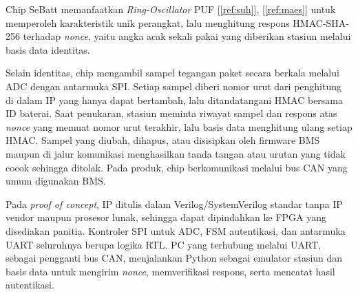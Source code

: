\documentclass[11pt,a4paper]{article}
\newcommand{\rujuk}[1]{[\ref{#1}]}   %
\begin{document}
Chip SeBatt memanfaatkan \textit{Ring-Oscillator} PUF \rujuk{ref:suh}, \rujuk{ref:maes} untuk memperoleh karakteristik unik perangkat, lalu menghitung respons HMAC-SHA-256 terhadap \textit{nonce}, yaitu angka acak sekali pakai yang diberikan stasiun melalui basis data identitas.

Selain identitas, chip mengambil sampel tegangan paket secara berkala melalui ADC dengan antarmuka SPI. Setiap sampel diberi nomor urut dari penghitung di dalam IP yang hanya dapat bertambah, lalu ditandatangani HMAC bersama ID baterai. Saat penukaran, stasiun meminta riwayat sampel dan respons atas \textit{nonce} yang memuat nomor urut terakhir, lalu basis data menghitung ulang setiap HMAC. Sampel yang diubah, dihapus, atau disisipkan oleh firmware BMS maupun di jalur komunikasi menghasilkan tanda tangan atau urutan yang tidak cocok sehingga ditolak. Pada produk, chip berkomunikasi melalui bus CAN yang umum digunakan BMS.

Pada \textit{proof of concept}, IP ditulis dalam Verilog/SystemVerilog standar tanpa IP vendor maupun prosesor lunak, sehingga dapat dipindahkan ke FPGA yang disediakan panitia. Kontroler SPI untuk ADC, FSM autentikasi, dan antarmuka UART seluruhnya berupa logika RTL. PC yang terhubung melalui UART, sebagai pengganti bus CAN, menjalankan Python sebagai emulator stasiun dan basis data untuk mengirim \textit{nonce}, memverifikasi respons, serta mencatat hasil autentikasi.
\end{document}
